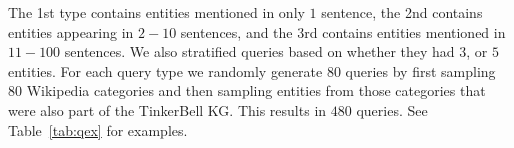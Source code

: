 \documentclass[a4paper]{article}
\newcommand{\tabref}[1]{Table~\ref{#1}}
\newcommand{\cM}{\mathcal{M}}
\newcommand{\nvge}{NVSE\xspace}
\begin{document}
 The 1st type contains entities mentioned in only $1$ sentence, the 2nd contains entities appearing in $2-10$ sentences, and the 3rd contains entities mentioned in $11-100$ sentences. We also stratified queries based on whether they had $3$, or $5$ entities. 
For each query type we randomly generate 80 queries by first sampling 80 Wikipedia categories and then sampling entities from those categories that were also part of the TinkerBell KG. This %
results in $480$ queries. See \tabref{tab:qex} for examples.

%
\end{document}
